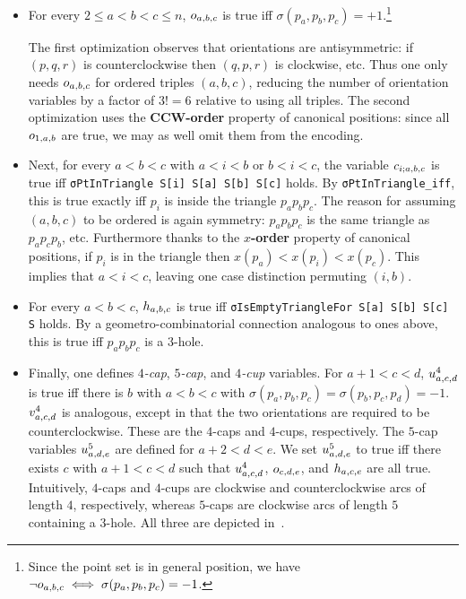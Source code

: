 \begin{itemize}
  \item
    For every $2 \leq a < b < c \leq n$, $\orvar_{a,b,c}$ is true
    iff $\sigma(p_a,p_b,p_c) = +1$.\footnote{
    Since the point set is in general position,
    we have $\neg \orvar_{a,b,c} \iff \sigma(p_a, p_b, p_c) = -1$.}

    The first optimization observes that orientations are antisymmetric:
    if $(p,q,r)$ is counterclockwise then $(q,p,r)$ is clockwise, etc.
    Thus one only needs $\orvar_{a,b,c}$ for ordered triples $(a,b,c)$,
    reducing the number of orientation variables by a factor of $3! = 6$
    relative to using all triples. The second optimization uses the \textbf{CCW-order} property of canonical positions:
    since all $\orvar_{1,a,b}$ are true, we may as well omit them from the encoding.

  \item
    Next, for every $a < b < c$ with $a < i < b$ or $b < i < c$,
    the variable $\cvar_{i;a,b,c}$ is true
    iff \lstinline|σPtInTriangle S[i] S[a] S[b] S[c]| holds.
    By \lstinline|σPtInTriangle_iff|, this is true exactly
    iff $p_i$ is inside the triangle $p_ap_bp_c$.
    The reason for assuming $(a,b,c)$ to be ordered is again symmetry:
    $p_ap_bp_c$ is the same triangle as $p_ap_cp_b$, etc.
    Furthermore thanks to the \textbf{$x$-order} property of canonical positions,
    if $p_i$ is in the triangle
    then $x(p_a) < x(p_i) < x(p_c)$.
    This implies that $a < i < c$,
    leaving one case distinction permuting $(i,b)$.

  \item
    For every $a < b < c$,
    $\hvar_{a,b,c}$ is true
    iff \lstinline|σIsEmptyTriangleFor S[a] S[b] S[c] S| holds. 
    By a geometro-combinatorial connection analogous to ones above,
    this is true iff $p_ap_bp_c$ is a $3$-hole.

  \item
    Finally, one defines \emph{$4$-cap}, \emph{$5$-cap}, and \emph{$4$-cup} variables.
    For $a+1 < c < d$, $\uvar_{a,c,d}$ is true
    iff there is $b$ with $a < b < c$ with $\sigma(p_a,p_b,p_c) = \sigma(p_b,p_c,p_d) = -1$.
    $\vvar_{a,c,d}$ is analogous, except in that the two orientations are required to be counterclockwise.
    These are the $4$-caps and $4$-cups, respectively.
    The $5$-cap variables $\ufvar_{a,d,e}$
    are defined for $a+2 < d < e$.
    We set $\ufvar_{a,d,e}$ to true
    iff there exists $c$ with $a+1<c<d$
    such that $\uvar_{a,c,d}$, $\orvar_{c,d,e}$, and $\hvar_{a,c,e}$ are all true.
    Intuitively, $4$-caps and $4$-cups are clockwise and counterclockwise arcs of length $4$,
    respectively,
    whereas $5$-caps are clockwise arcs of length $5$ containing a $3$-hole.
    All three are depicted in~.
\end{itemize}

